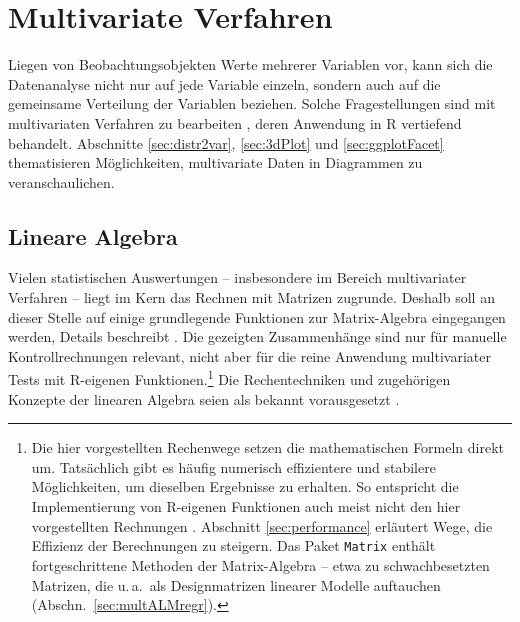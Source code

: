 \chapter{Multivariate Verfahren}
\label{sec:multivariate}

Liegen von Beobachtungsobjekten Werte mehrerer Variablen vor, kann sich die Datenanalyse nicht nur auf jede Variable einzeln, sondern auch auf die gemeinsame Verteilung der Variablen beziehen. Solche Fragestellungen sind mit multivariaten Verfahren zu bearbeiten \cite{Backhaus2008, Backhaus2013}, deren Anwendung in R  vertiefend behandelt. Abschnitte \ref{sec:distr2var}, \ref{sec:3dPlot} und \ref{sec:ggplotFacet} thematisieren Möglichkeiten, multivariate Daten in Diagrammen zu veranschaulichen.

\section{Lineare Algebra}
\label{sec:linAlg}

Vielen statistischen Auswertungen -- insbesondere im Bereich multivariater Verfahren -- liegt im Kern das Rechnen mit Matrizen zugrunde. Deshalb soll an dieser Stelle auf einige grundlegende Funktionen zur Matrix-Algebra eingegangen werden, Details beschreibt . Die gezeigten Zusammenhänge sind nur für manuelle Kontrollrechnungen relevant, nicht aber für die reine Anwendung multivariater Tests mit R-eigenen Funktionen.\footnote{Die hier vorgestellten Rechenwege setzen die mathematischen Formeln direkt um. Tatsächlich gibt es häufig numerisch effizientere und stabilere Möglichkeiten, um dieselben Ergebnisse zu erhalten. So entspricht die Implementierung von R-eigenen Funktionen auch meist nicht den hier vorgestellten Rechnungen \cite{Bates2004}. Abschnitt \ref{sec:performance} erläutert Wege, die Effizienz der Berechnungen zu steigern. Das Paket \lstinline!Matrix! \cite{Bates2009} enthält fortgeschrittene Methoden der Matrix-Algebra -- etwa zu schwachbesetzten Matrizen, die u.\,a.\ als Designmatrizen linearer Modelle auftauchen (Abschn.\ \ref{sec:multALMregr}).} Die Rechentechniken und zugehörigen Konzepte der linearen Algebra seien als bekannt vorausgesetzt \cite{Fischer2008, Strang2003}.

